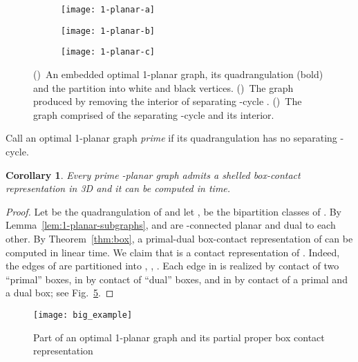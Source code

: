 \documentclass{article}
\newcounter{dummycount}
\newtheorem{corollary}[theorem]{Corollary}
\newenvironment{backInTime}[1]
{
\setcounter{dummycount}{\value{theorem}}
\setcounter{theorem}{\value{#1}}
}
{
\setcounter{theorem}{\value{dummycount}}
}
\newcommand{\df}{\textit}
\begin{document}
\begin{figure}[htb]
\centering
  \begin{subfigure}[t]{.3\textwidth}
    \centering
    \texttt{[image: 1-planar-a]}
    \caption{}
    \label{fig:opt-1-planar}
  \end{subfigure}
  \hspace{1em}
  \begin{subfigure}[t]{.3\textwidth}
    \centering
    \texttt{[image: 1-planar-b]}
    \caption{}
    \label{fig:opt-H1}
  \end{subfigure}
  \hspace{2em}
  \begin{subfigure}[t]{.15\textwidth}
    \texttt{[image: 1-planar-c]}
    \caption{}
    \label{fig:opt-H2}
  \end{subfigure}
  \caption{()~An embedded optimal 1-planar graph, its quadrangulation  (bold) and the partition into white and black vertices.
  ()~The graph  produced by removing the interior of separating -cycle .
  ()~The graph  comprised of the separating -cycle and its interior.}
\end{figure}




Call an optimal 1-planar graph \df{prime} if its quadrangulation has no separating -cycle.

\begin{backInTime}{th-prime}
\begin{corollary}\label{cor:goodCase}
Every prime -planar graph  admits a shelled box-contact representation
in 3D and it can be computed in  time.
\end{corollary}
\end{backInTime}
\begin{proof}
Let  be the quadrangulation of  and let ,  be the bipartition classes of .
 By Lemma~\ref{lem:1-planar-subgraphs},  and  are -connected planar and dual to each other.
 By Theorem~\ref{thm:box}, a primal-dual box-contact representation  of 
 can be computed in linear time.
 We claim that  is a contact representation of .
 Indeed, the edges of  are partitioned into , , .
 Each edge in  is realized by contact of two ``primal'' boxes, in  by contact of ``dual'' boxes, and in  by contact of a primal and a dual box; see Fig.~\ref{fig:big_example}.
\end{proof}


\begin{figure}[htb]
 \centering
 \texttt{[image: big\_example]}
 \caption{Part of an optimal 1-planar graph and its partial proper box contact representation}
 \label{fig:big_example}
\end{figure}
\end{document}
